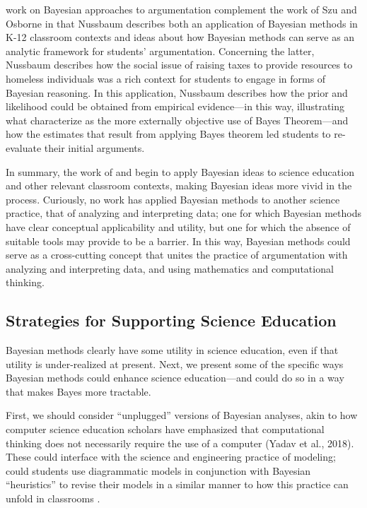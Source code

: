 \documentclass[man]{apa7}
\begin{document}
\textcite{n11} work on Bayesian approaches to argumentation complement the work of Szu and Osborne in that Nussbaum describes both an application of Bayesian methods in K-12 classroom contexts and ideas about how Bayesian methods can serve as an analytic framework for students’ argumentation. Concerning the latter, Nussbaum describes how the social issue of raising taxes to provide resources to homeless individuals was a rich context for students to engage in forms of Bayesian reasoning. In this application, Nussbaum describes how the prior and likelihood could be obtained from empirical evidence—in this way, illustrating what \textcite{so12} characterize as the more externally objective use of Bayes Theorem—and how the estimates that result from applying Bayes theorem led students to re-evaluate their initial arguments. 

In summary, the work of \textcite{so12} and \textcite{n11} begin to apply Bayesian ideas to science education and other relevant classroom contexts, making Bayesian ideas more vivid in the process. Curiously, no work has applied Bayesian methods to another science practice, that of analyzing and interpreting data; one for which Bayesian methods have clear conceptual applicability and utility, but one for which the absence of suitable tools may provide to be a barrier. In this way, Bayesian methods could serve as a cross-cutting concept \parencite{nrc12} that unites the practice of argumentation with analyzing and interpreting data, and using mathematics and computational thinking.

\subsection{Strategies for Supporting Science Education}

Bayesian methods clearly have some utility in science education, even if that utility is under-realized at present. Next, we present some of the specific ways Bayesian methods could enhance science education—and could do so in a way that makes Bayes more tractable.

First, we should consider ``unplugged'' versions of Bayesian analyses, akin to how computer science education scholars have emphasized that computational thinking does not necessarily require the use of a computer (Yadav et al., 2018). These could interface with the science and engineering practice of modeling; could students use diagrammatic models in conjunction with Bayesian “heuristics” to revise their models in a similar manner to how this practice can unfold in classrooms \parencite{schwarz2009developing}. 
\end{document}
